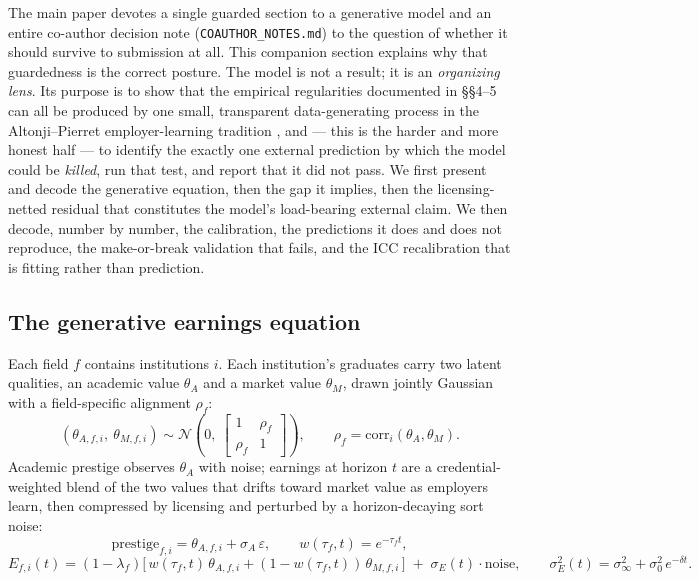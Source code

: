 \documentclass[11pt]{article}
\begin{document}
The main paper devotes a single guarded section to a generative model and an entire co-author decision note (\texttt{COAUTHOR\_NOTES.md}) to the question of whether it should survive to submission at all. This companion section explains why that guardedness is the correct posture. The model is not a result; it is an \emph{organizing lens}. Its purpose is to show that the empirical regularities documented in \S\S4--5 can all be produced by one small, transparent data-generating process in the Altonji--Pierret employer-learning tradition \citep{altonji2001employer}, and --- this is the harder and more honest half --- to identify the exactly one external prediction by which the model could be \emph{killed}, run that test, and report that it did not pass. We first present and decode the generative equation, then the gap it implies, then the licensing-netted residual that constitutes the model's load-bearing external claim. We then decode, number by number, the calibration, the predictions it does and does not reproduce, the make-or-break validation that fails, and the ICC recalibration that is fitting rather than prediction.

\subsection{The generative earnings equation}

Each field $f$ contains institutions $i$. Each institution's graduates carry two latent qualities, an academic value $\theta_A$ and a market value $\theta_M$, drawn jointly Gaussian with a field-specific alignment $\rho_f$:
\[
(\theta_{A,f,i},\ \theta_{M,f,i}) \sim \mathcal{N}\!\left(0,\ \begin{bmatrix} 1 & \rho_f \\ \rho_f & 1 \end{bmatrix}\right),
\qquad
\rho_f = \mathrm{corr}_i(\theta_A,\theta_M).
\]
Academic prestige observes $\theta_A$ with noise; earnings at horizon $t$ are a credential-weighted blend of the two values that drifts toward market value as employers learn, then compressed by licensing and perturbed by a horizon-decaying sort noise:
\[
\mathrm{prestige}_{f,i} = \theta_{A,f,i} + \sigma_A\,\varepsilon,
\qquad
w(\tau_f,t) = e^{-\tau_f t},
\]
\[
E_{f,i}(t) = (1-\lambda_f)\big[\,w(\tau_f,t)\,\theta_{A,f,i} + (1-w(\tau_f,t))\,\theta_{M,f,i}\,\big] \;+\; \sigma_E(t)\cdot \mathrm{noise},
\qquad
\sigma_E^2(t) = \sigma_\infty^2 + \sigma_0^2\,e^{-\delta t}.
\]
\end{document}
